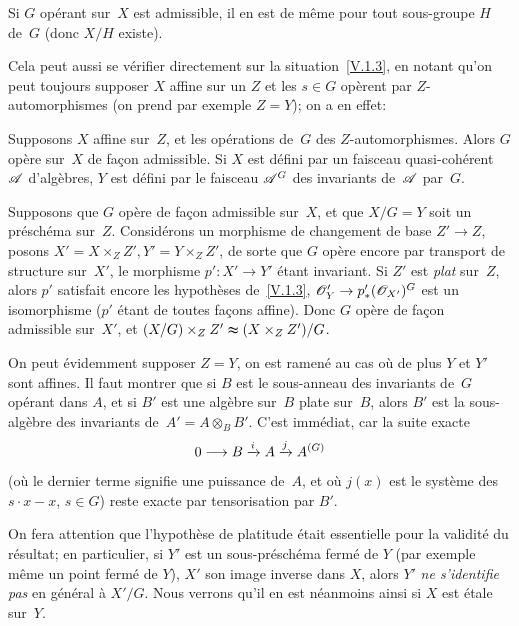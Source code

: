 \begin{corollaire}
\label{cor:V.1.7}
Si $G$ op\'erant sur~$X$ est admissible, il en est de m\^eme pour
tout sous-groupe $H$ de~$G$ (donc $X/H$ existe).
\end{corollaire}

Cela peut aussi se v\'erifier directement sur la
situation~\ref{V.1.3}, en notant qu'on peut toujours supposer $X$
affine sur un $Z$ et les $s\in G$ op\`erent par $Z$-automorphismes
(on prend par exemple $Z=Y$); on a en effet:

\begin{corollaire}
\label{cor:V.1.8}
Supposons $X$ affine sur~$Z$, et les op\'erations de~$G$ des
$Z$-auto\-mor\-phismes. Alors $G$ op\`ere sur~$X$ de fa\c con
admissible. Si $X$ est d\'efini par un faisceau quasi-coh\'erent
$\cal{A}$ d'alg\`ebres, $Y$ est d\'efini par le faisceau
$\cal{A}^G$ des invariants de~$\cal{A}$ par~$G$.
\end{corollaire}

\begin{proposition}
\label{V.1.9}
Supposons que $G$ op\`ere de fa\c con admissible sur~$X$, et que
$X/G=Y$ soit un pr\'esch\'ema sur~$Z$. Consid\'erons un
morphisme de changement de base $Z'\to Z$, posons $X'=X\times_Z Z',
Y'=Y\times_Z Z'$, de sorte que $G$ op\`ere encore par transport de
structure sur~$X'$, le morphisme $p'\colon X'\to Y'$ \'etant
invariant. Si $Z'$ est \emph{plat} sur~$Z$, alors $p'$ satisfait
encore les hypoth\`eses
de~\ref{V.1.3},
\ie $\cal{O}_Y'\to
p_*'(\cal{O}_{X'})^G$ est un isomorphisme ($p'$ \'etant de toutes
fa\c cons affine). Donc $G$ op\`ere de fa\c con admissible sur~$X'$, et $(X/G)\times_Z Z'\thickapprox (X\times_Z Z')/G$.
\end{proposition}

On peut \'evidemment supposer $Z=Y$, on est ramen\'e au cas o\`u
de plus $Y$ et $Y'$ sont affines. Il faut montrer que si $B$ est le
sous-anneau des invariants de~$G$ op\'erant dans $A$, et si $B'$ est
une alg\`ebre sur~$B$ plate sur~$B$, alors $B'$ est la
sous-alg\`ebre des invariants de~$A'=A\otimes_B B'$. C'est
imm\'ediat, car la suite exacte
\enlargethispage{.5cm}$$
0 \to B \lto{i} A \lto{j} A^{(G)}
$$
(o\`u le dernier terme signifie une puissance de~$A$, et o\`u
$j(x)$ est le syst\`eme des $s\cdot x-x$, $s\in G$) reste exacte par
tensorisation par
$B'$.

On fera attention que l'hypoth\`ese de platitude \'etait
essentielle pour la validit\'e du r\'esultat; en particulier, si
$Y'$ est un sous-pr\'esch\'ema ferm\'e de
$Y$
(par exemple m\^eme un point ferm\'e de
$Y$),
$X'$ son image inverse dans $X$,
alors $Y'$ \emph{ne s'identifie pas} en g\'en\'eral \`a
$X'/G$. Nous verrons qu'il en est n\'eanmoins ainsi si $X$ est
\'etale sur~$Y$.

